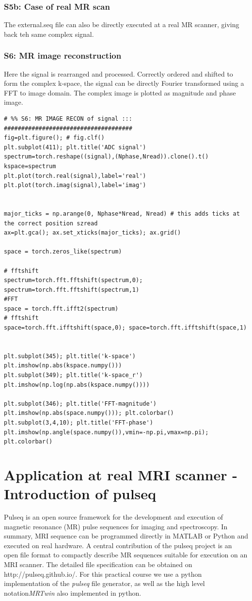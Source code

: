 \documentclass[a4paper,12pt]{extarticle}
\begin{document}
\subsubsection{S5b: Case of real MR scan}
The external.seq file can also be directly executed at a real MR scanner, giving back teh same complex signal.

\subsubsection{S6: MR image reconstruction}
Here the signal is rearranged and processed.
Correctly ordered and shifted to form the complex k-space, the signal can be directly Fourier transformed using a FFT to image domain.
The complex image is plotted as magnitude and phase image.

\begin{verbatim}
# %% S6: MR IMAGE RECON of signal ::: #####################################
fig=plt.figure(); # fig.clf()
plt.subplot(411); plt.title('ADC signal')
spectrum=torch.reshape((signal),(Nphase,Nread)).clone().t()
kspace=spectrum
plt.plot(torch.real(signal),label='real')
plt.plot(torch.imag(signal),label='imag')


major_ticks = np.arange(0, Nphase*Nread, Nread) # this adds ticks at the correct position szread
ax=plt.gca(); ax.set_xticks(major_ticks); ax.grid()

space = torch.zeros_like(spectrum)

# fftshift
spectrum=torch.fft.fftshift(spectrum,0); spectrum=torch.fft.fftshift(spectrum,1)
#FFT
space = torch.fft.ifft2(spectrum)
# fftshift
space=torch.fft.ifftshift(space,0); space=torch.fft.ifftshift(space,1)


plt.subplot(345); plt.title('k-space')
plt.imshow(np.abs(kspace.numpy()))
plt.subplot(349); plt.title('k-space_r')
plt.imshow(np.log(np.abs(kspace.numpy())))

plt.subplot(346); plt.title('FFT-magnitude')
plt.imshow(np.abs(space.numpy())); plt.colorbar()
plt.subplot(3,4,10); plt.title('FFT-phase')
plt.imshow(np.angle(space.numpy()),vmin=-np.pi,vmax=np.pi); plt.colorbar()

\end{verbatim}


\section{Application at real MRI scanner - Introduction of pulseq}
\vspace{7.5cm}
	Pulseq is an open source framework for the development and execution of magnetic resonance (MR) pulse sequences for imaging and spectroscopy. In summary, MRI sequence can be programmed directly in MATLAB or Python and executed on real hardware.
    A central contribution of the pulseq project is an open file format to compactly describe MR sequences suitable for execution on an MRI scanner. The detailed file specification can be obtained on http://pulseq.github.io/.
    For this practical course we use a  python implementation of the \emph{pulseq} file generator, as well as the  high level notation\emph{MRTwin} also implemented in python.  
\end{document}
